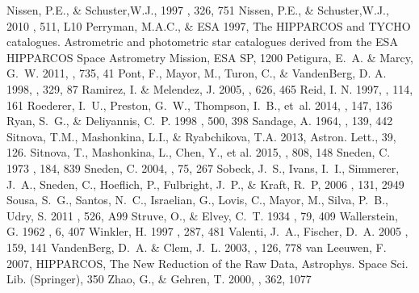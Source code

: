 \documentclass[revtex4]{emulateapj}
\begin{document}
\begin{thebibliography}{1}
 Nissen, P.E., \& Schuster,W.J., 1997 \aap, 326, 751
 Nissen, P.E., \& Schuster,W.J., 2010 \aap, 511, L10
 Perryman, M.A.C., \& ESA 1997, The HIPPARCOS and TYCHO catalogues. Astrometric and photometric star catalogues derived from the ESA HIPPARCOS Space Astrometry Mission, ESA SP, 1200
 Petigura, E.~A. \& Marcy, G.~W. 2011, \apj, 735, 41
Pont, F., Mayor, M., Turon, C., \& VandenBerg, D. A. 1998, \aap, 329, 87
 Ramirez, I. \& Melendez, J. 2005, \apj, 626, 465
Reid, I. N. 1997, \aj, 114, 161
 Roederer, I.~U., Preston, G.~W., Thompson, I.~B., et~al. 2014, \apj, 147, 136
Ryan, S.~G., \& Deliyannis, C.~P. 1998 \apj, 500, 398
 Sandage, A. 1964, \apj, 139, 442 
 Sitnova, T.M., Mashonkina, L.I., \& Ryabchikova, T.A. 2013, Astron. Lett., 39, 126.
 Sitnova, T., Mashonkina, L., Chen, Y., et al. 2015, \apj, 808, 148
 Sneden, C. 1973 \apj, 184, 839
 Sneden, C. 2004, \memsai, 75, 267
 Sobeck, J.~S., Ivans, I.~I., Simmerer, J.~A., Sneden, C., Hoeflich, P., Fulbright, J.~P., \& Kraft, R.~P, 2006 \aj, 131, 2949
 Sousa, S.~G., Santos, N.~C., Israelian, G., Lovis, C., Mayor, M., Silva, P.~B., Udry, S. 2011 \aap, 526, A99
 Struve, O., \& Elvey, C.~T. 1934 \apj, 79, 409
 Wallerstein, G. 1962 \apjs, 6, 407
 Winkler, H. 1997 \mnras, 287, 481
 Valenti, J.~A., Fischer, D.~A. 2005 \apjs, 159, 141
 VandenBerg, D.~A. \& Clem, J.~L. 2003, \apj, 126, 778
 van Leeuwen, F.  2007,  HIPPARCOS, The New Reduction of the Raw Data, Astrophys. Space Sci. Lib. (Springer), 350 Zhao, G., \& Gehren, T. 2000, \aap, 362, 1077

\end{thebibliography}
\end{document}
